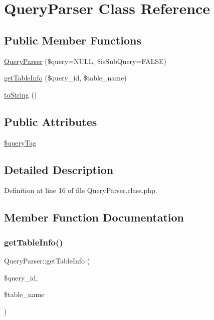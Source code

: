 \hypertarget{classQueryParser}{}\section{Query\+Parser Class Reference}
\label{classQueryParser}
\subsection*{Public Member Functions}
\begin{DoxyCompactItemize}
\item 
\hyperlink{classQueryParser_a4f47d1fe660e953922e2a2e086e9271f}{Query\+Parser} (\$query=N\+U\+LL, \$is\+Sub\+Query=F\+A\+L\+SE)
\item 
\hyperlink{classQueryParser_a4d801af44f4929b30bebfefb81e6ec04}{get\+Table\+Info} (\$query\+\_\+id, \$table\+\_\+name)
\item 
\hyperlink{classQueryParser_aba87968bb8c4ad2167e43fc1ba9ad448}{to\+String} ()
\end{DoxyCompactItemize}
\subsection*{Public Attributes}
\begin{DoxyCompactItemize}
\item 
\hyperlink{classQueryParser_a802feca31cc80049e9d813915280ac85}{\$query\+Tag}
\end{DoxyCompactItemize}


\subsection{Detailed Description}


Definition at line 16 of file Query\+Parser.\+class.\+php.



\subsection{Member Function Documentation}
\hypertarget{classQueryParser_a4d801af44f4929b30bebfefb81e6ec04}{}\label{classQueryParser_a4d801af44f4929b30bebfefb81e6ec04} 
\subsubsection{\texorpdfstring{get\+Table\+Info()}{getTableInfo()}}
{\footnotesize\ttfamily Query\+Parser\+::get\+Table\+Info (\begin{DoxyParamCaption}\item[{}]{\$query\+\_\+id,  }\item[{}]{\$table\+\_\+name }\end{DoxyParamCaption})}

